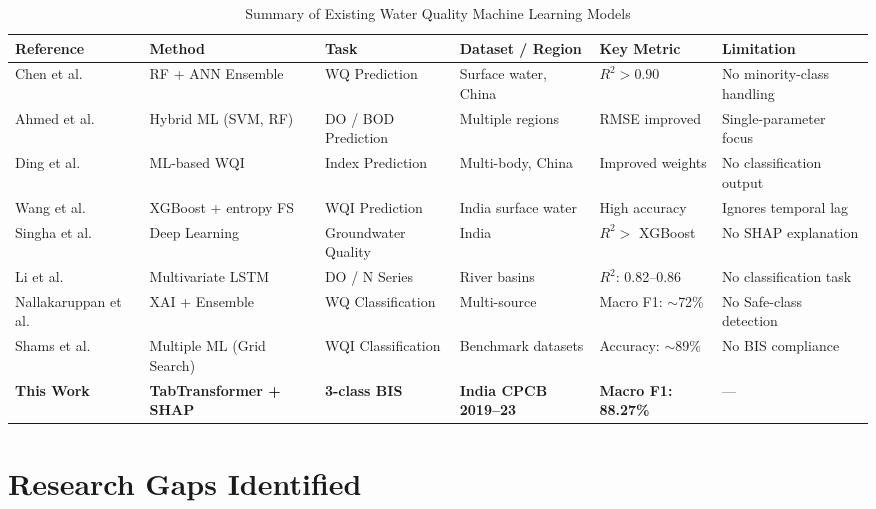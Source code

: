 \documentclass[12pt,a4paper]{report}
\numberwithin{table}{chapter}
\numberwithin{figure}{chapter}
\begin{document}
\vspace{0.3cm}
\begin{table}[ht]
\caption{Summary of Existing Water Quality Machine Learning Models}
\label{tab:litreview}
\centering
\small
\begin{tabular}{@{} L{2.0cm} L{2.0cm} L{1.8cm} L{2.2cm} L{1.8cm} L{2.4cm} @{}}
\toprule
\textbf{Reference} & \textbf{Method} & \textbf{Task} & \textbf{Dataset / Region} & \textbf{Key Metric} & \textbf{Limitation} \\
\midrule
Chen et al.~\cite{chen2020}         & RF + ANN Ensemble        & WQ Prediction       & Surface water, China      & $R^2 > 0.90$      & No minority-class handling \\
Ahmed et al.~\cite{ahmed2019}       & Hybrid ML (SVM, RF)      & DO / BOD Prediction & Multiple regions          & RMSE improved     & Single-parameter focus \\
Ding et al.~\cite{ding2023}         & ML-based WQI             & Index Prediction    & Multi-body, China         & Improved weights  & No classification output \\
Wang et al.~\cite{wang2023}         & XGBoost + entropy FS     & WQI Prediction      & India surface water       & High accuracy     & Ignores temporal lag \\
Singha et al.~\cite{singha2021}     & Deep Learning            & Groundwater Quality & India                     & $R^2 >$ XGBoost   & No SHAP explanation \\
Li et al.~\cite{li2023}             & Multivariate LSTM        & DO / N Series       & River basins              & $R^2$: 0.82--0.86 & No classification task \\
Nallakaruppan et al.~\cite{nalla2024} & XAI + Ensemble         & WQ Classification   & Multi-source              & Macro F1: $\sim$72\% & No Safe-class detection \\
Shams et al.~\cite{shams2024}       & Multiple ML (Grid Search)& WQI Classification  & Benchmark datasets        & Accuracy: $\sim$89\% & No BIS compliance \\
\textbf{This Work}                  & \textbf{TabTransformer + SHAP} & \textbf{3-class BIS} & \textbf{India CPCB 2019--23} & \textbf{Macro F1: 88.27\%} & --- \\
\bottomrule
\end{tabular}
\end{table}
\centering

\section{Research Gaps Identified}
\end{document}
